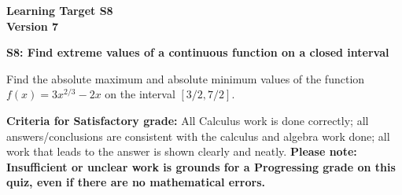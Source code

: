 \documentclass[10pt]{article}
\begin{document}
	\vspace*{0in}

		\begin{center}
			\textbf{Learning Target S8 \\
			Version 7} 
		\end{center}


\begin{framed}
	\textbf{S8: Find extreme values of a continuous function on a closed interval}
\end{framed}

Find the absolute maximum and absolute minimum values of the function $f(x)=3x^{2/3}-2x$ on the interval $[3/2,7/2]$.

\vfill

\begin{small}
    \begin{framed}
        	\textbf{Criteria for Satisfactory grade:} All Calculus work is done correctly; all answers/conclusions are consistent with the calculus and algebra work done; all work that leads to the answer is shown clearly and neatly. \textbf{Please note: Insufficient or unclear work is grounds for a Progressing grade on this quiz, even if there are no mathematical errors.}
    \end{framed}

\end{small}
\end{document}
